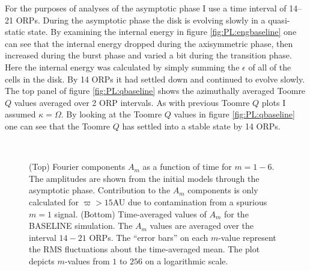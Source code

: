 For the purposes of analyses of the asymptotic phase I use a time interval of 14--21 ORPs. During the asymptotic phase the disk is evolving slowly in a quasi-static state. By examining the internal energy in figure \ref{fig:PL:engbaseline} one can see that the internal energy dropped during the axisymmetric phase, then increased during the burst phase and varied a bit during the transition phase. Here the internal energy was calculated by simply summing the $\epsilon$ of all of the cells in the disk. By 14 ORPs it had settled down and continued to evolve slowly. The top panel of figure \ref{fig:PL:qbaseline} shows the azimuthally averaged Toomre $Q$ values averaged over 2 ORP intervals. As with previous Toomre $Q$ plots I assumed $\kappa = \Omega$. By looking at the Toomre $Q$ values in figure \ref{fig:PL:qbaseline} one can see that the Toomre $Q$ has settled into a stable state by 14 ORPs.

\begin{figure}[p]
\centering
{}\\
\caption[NEED TAGLINE]{(Top) Fourier components $A_m$ as a function of time for $m = 1 - 6$. The amplitudes are shown from the initial models through the asymptotic phase. Contribution to the $A_m$ components is only calculated for $\varpi > 15$AU due to contamination from a spurious $m = 1$ signal. (Bottom) Time-averaged values of $A_m$ for the BASELINE simulation. The $A_m$ values are averaged over the interval $14 -21$ ORPs. The ``error bars'' on each $m$-value represent the RMS fluctuations about the time-averaged mean. The plot depicts $m$-values from $1$ to $256$ on a logarithmic scale.}
\label{fig:PL:ambaseline}
\end{figure}

